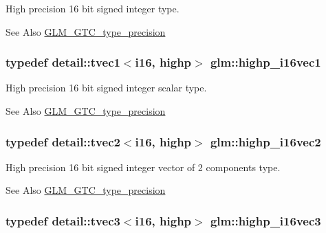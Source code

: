 High precision 16 bit signed integer type. \begin{DoxySeeAlso}{See Also}
\hyperlink{group__gtc__type__precision}{G\-L\-M\-\_\-\-G\-T\-C\-\_\-type\-\_\-precision} 
\end{DoxySeeAlso}
\hypertarget{group__gtc__type__precision_ga0ed3103e2d3acb4efbe313add4243a72}{
\subsubsection[{highp\-\_\-i16vec1}]{\setlength{\rightskip}{0pt plus 5cm}typedef detail\-::tvec1$<$i16, highp$>$ {\bf glm\-::highp\-\_\-i16vec1}}}\label{group__gtc__type__precision_ga0ed3103e2d3acb4efbe313add4243a72}
High precision 16 bit signed integer scalar type. \begin{DoxySeeAlso}{See Also}
\hyperlink{group__gtc__type__precision}{G\-L\-M\-\_\-\-G\-T\-C\-\_\-type\-\_\-precision} 
\end{DoxySeeAlso}
\hypertarget{group__gtc__type__precision_ga74df9e215c049f82d277473c4c974bb4}{
\subsubsection[{highp\-\_\-i16vec2}]{\setlength{\rightskip}{0pt plus 5cm}typedef detail\-::tvec2$<$i16, highp$>$ {\bf glm\-::highp\-\_\-i16vec2}}}\label{group__gtc__type__precision_ga74df9e215c049f82d277473c4c974bb4}
High precision 16 bit signed integer vector of 2 components type. \begin{DoxySeeAlso}{See Also}
\hyperlink{group__gtc__type__precision}{G\-L\-M\-\_\-\-G\-T\-C\-\_\-type\-\_\-precision} 
\end{DoxySeeAlso}
\hypertarget{group__gtc__type__precision_ga8dcfd412bd9ce99a1cf5c2b6e50f07e7}{
\subsubsection[{highp\-\_\-i16vec3}]{\setlength{\rightskip}{0pt plus 5cm}typedef detail\-::tvec3$<$i16, highp$>$ {\bf glm\-::highp\-\_\-i16vec3}}}\label{group__gtc__type__precision_ga8dcfd412bd9ce99a1cf5c2b6e50f07e7}
